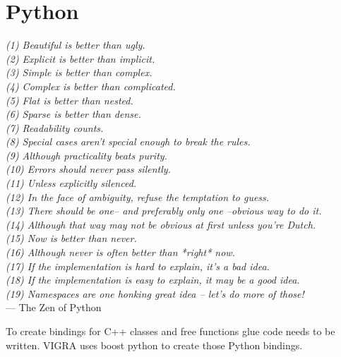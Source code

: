 \section{Python}\label{sec:graph_lib_python}

\begin{scriptsize}
\begin{flushright}{\slshape    
(1) Beautiful is better than ugly. \\ \label{cit:line_a}
(2) Explicit is better than implicit. \\ \label{cit:line_b}
(3) Simple is better than complex. \\
(4) Complex is better than complicated. \\
(5) Flat is better than nested. \\
(6) Sparse is better than dense. \\
(7) Readability counts. \\
(8) Special cases aren't special enough to break the rules. \\
(9) Although practicality beats purity. \\
(10) Errors should never pass silently. \\
(11) Unless explicitly silenced. \\
(12) In the face of ambiguity, refuse the temptation to guess. \\
(13) There should be one-- and preferably only one --obvious way to do it. \\
(14) Although that way may not be obvious at first unless you're Dutch. \\
(15) Now is better than never. \\
(16) Although never is often better than *right* now. \\
(17) If the implementation is hard to explain, it's a bad idea. \\
(18) If the implementation is easy to explain, it may be a good idea. \\
(19) Namespaces are one honking great idea -- let's do more of those! } \\ \medskip
--- The Zen of Python
\end{flushright}
\end{scriptsize}



To create bindings for C++ classes and free functions glue code needs to 
be written. VIGRA uses boost python \cite{???} to create those Python bindings.

